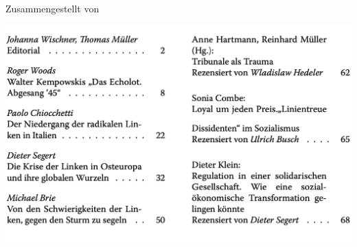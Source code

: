 \vspace*{1cm}
\begin{center}
   {\bdititle \bdiTitle}\\ \vspace{20pt}
   {\bdisubtitle Zusammengestellt von \collectedBy}\\
\end{center}
\vspace*{.5cm}
\begin{multicols}{2}
    \includegraphics[scale=0.55]{toc.png}
\end{multicols}

\pagebreak